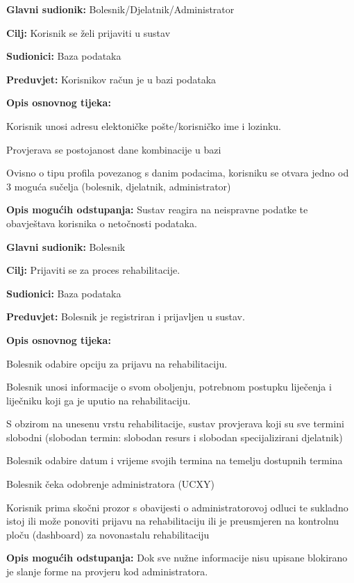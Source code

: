 	\item \textbf{Glavni sudionik:} Bolesnik/Djelatnik/Administrator
	\item \textbf{Cilj:} Korisnik se želi prijaviti u sustav 
	\item \textbf{Sudionici:} Baza podataka
	\item \textbf{Preduvjet:} Korisnikov račun je u bazi podataka
	\item \textbf{Opis osnovnog tijeka:}
	\begin{packed_enum}
		\item Korisnik unosi adresu elektoničke pošte/korisničko ime i lozinku.
		\item Provjerava se postojanost dane kombinacije u bazi
		\item Ovisno o tipu profila povezanog s danim podacima, korisniku se otvara jedno od 3 moguća sučelja (bolesnik, djelatnik, administrator)
	\end{packed_enum}
	\item \textbf{Opis mogućih odstupanja:}
	Sustav reagira na neispravne podatke te obavještava korisnika o netočnosti podataka. \\
\closeusecase


	\item \textbf{Glavni sudionik:} Bolesnik
	\item \textbf{Cilj:} Prijaviti se za proces rehabilitacije.
	\item \textbf{Sudionici:} Baza podataka
	\item \textbf{Preduvjet:} Bolesnik je registriran i prijavljen u sustav.
	\item \textbf{Opis osnovnog tijeka:}
	\begin{packed_enum}
		\item Bolesnik odabire opciju za prijavu na rehabilitaciju.
		\item Bolesnik unosi informacije o svom oboljenju, potrebnom postupku liječenja i liječniku koji ga je uputio na rehabilitaciju.
        \item S obzirom na unesenu vrstu rehabilitacije, sustav provjerava koji su sve termini slobodni (slobodan termin: slobodan resurs i slobodan specijalizirani djelatnik) 
		\item Bolesnik odabire datum i vrijeme svojih termina na temelju dostupnih termina 
        \item Bolesnik čeka odobrenje administratora (UCXY) 
        \item Korisnik prima skočni prozor s obavijesti o administratorovoj odluci te sukladno istoj ili može ponoviti prijavu na rehabilitaciju ili je preusmjeren na kontrolnu ploču (dashboard) za novonastalu rehabilitaciju
	\end{packed_enum}
	\item \textbf{Opis mogućih odstupanja:}
	Dok sve nužne informacije nisu upisane blokirano je slanje forme na provjeru kod administratora. 
\closeusecase

